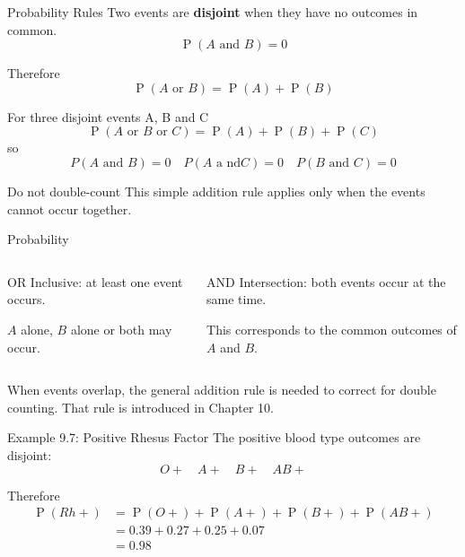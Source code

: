 \documentclass[aspectratio=169]{beamer}
\newcommand{\prob}[1]{\operatorname{P}\!\left(#1\right)}
\begin{document}
\begin{frame}{Probability Rules}
Two events are \textbf{disjoint} when they have no outcomes in common.
$$\prob{A\text{ and }B}=0$$

Therefore
$$\prob{A\text{ or }B}=\prob{A}+\prob{B}$$

For three disjoint events A, B and C
$$\prob{A\text{ or }B\text{ or }C}=\prob{A}+\prob{B}+\prob{C}$$
so 
$$P(A \text{ and } B) = 0 \quad P(A \text{ a nd} C) = 0 \quad P(B \text{ and } C) = 0$$

\begin{alertblock}{Do not double-count}
This simple addition rule applies only when the events cannot occur together.
\end{alertblock}
\end{frame}

\begin{frame}{Probability}
\begin{columns}[T,onlytextwidth]
\begin{block}{OR}
Inclusive: at least one event occurs.

\medskip
$A$ alone, $B$ alone or both may occur.
\end{block}

\begin{block}{AND}
Intersection: both events occur at the same time.

\medskip
This corresponds to the common outcomes of $A$ and $B$.
\end{block}
\end{columns}

\vspace{0.4cm}
When events overlap, the general addition rule is needed to correct for double counting. That rule is introduced in Chapter 10.
\end{frame}

\begin{frame}{Example 9.7: Positive Rhesus Factor}
The positive blood type outcomes are disjoint:
$$O+\quad A+\quad B+\quad AB+$$

Therefore
\begin{align*}
\prob{Rh+} &=\prob{O+}+\prob{A+}+\prob{B+}+\prob{AB+}\\
		&=0.39+0.27+0.25+0.07\\
		&=\boxed{0.98}
\end{align*}
\end{frame}
\end{document}
